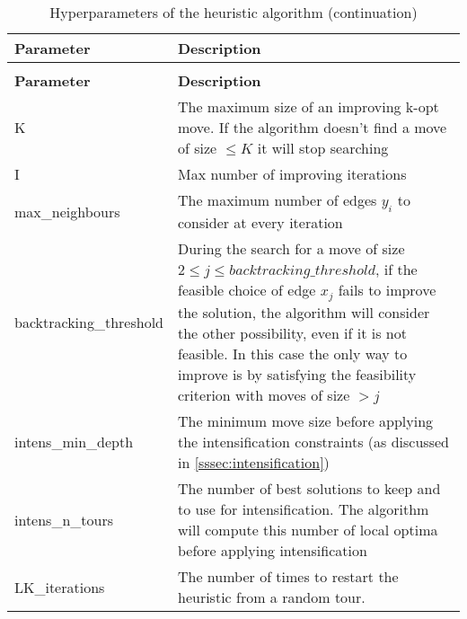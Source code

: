 
\renewcommand{\arraystretch}{1.5}
\setlength{\arrayrulewidth}{1.2pt}
\begin{longtable}{lX}
	\caption{Hyperparameters of the heuristic algorithm}\\
	\hline
	\rowcolor{myred} %
	\color{white}\textbf{Parameter} & \color{white}\textbf{Description}\\
	\hline
	\endfirsthead
	\rowcolor{white}
	\caption[]{Hyperparameters of the heuristic algorithm (continuation)}\\
	\hline
	\rowcolor{myred}
	\color{white}\textbf{Parameter} & \color{white}\textbf{Description}\\
	\hline
	\endhead
	\hline %
	\endlastfoot %
	K  & The maximum size of an improving k-opt move. If the algorithm doesn't find a move of size $\le K$ it will stop searching  \\
	I  & Max number of improving iterations \\
	max\_neighbours   & The maximum number of edges $y_i$ to consider at every iteration \\
	backtracking\_threshold & During the search for a move of size $2 \le j \le backtracking\_threshold$, if the feasible choice of edge $x_j$ fails to improve the solution, the algorithm will consider the other possibility, even if it is not feasible. In this case the only way to improve is by satisfying the feasibility criterion with moves of size $> j$\\
	intens\_min\_depth & The minimum move size before applying the intensification constraints (as discussed in \cref{sssec:intensification})\\
	intens\_n\_tours & The number of best solutions to keep and to use for intensification. The algorithm will compute this number of local optima before applying intensification\\
	LK\_iterations & The number of times to restart the heuristic from a random tour.
	\label{tab:hyperparameters} \\
\end{longtable}
\setlength{\arrayrulewidth}{1pt}
\renewcommand{\arraystretch}{1}
